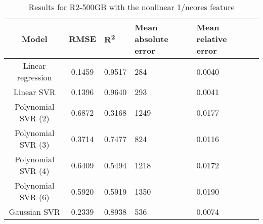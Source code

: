 \begin{table}[H]
\centering
\begin{adjustbox}{center}
\begin{tabular}{c | c M{1.2cm} M{2.5cm} M{2.5cm} M{1.8cm}}
Model & RMSE & R\textsuperscript{2} & Mean absolute error & Mean relative error \tabularnewline
\hline
Linear regression & 0.1459 & 0.9517 &    284 & 0.0040 \\
Linear SVR & 0.1396 & 0.9640 &    293 & 0.0041 \\
Polynomial SVR (2) & 0.6872 & 0.3168 &   1249 & 0.0177 \\
Polynomial SVR (3) & 0.3714 & 0.7477 &    824 & 0.0116 \\
Polynomial SVR (4) & 0.6409 & 0.5494 &   1218 & 0.0172 \\
Polynomial SVR (6) & 0.5920 & 0.5919 &   1350 & 0.0190 \\
Gaussian SVR & 0.2339 & 0.8938 &    536 & 0.0074 \\
\end{tabular}
\end{adjustbox}
\\
\caption{Results for R2-500GB with the nonlinear 1/ncores feature}
\label{tab:all_nonlinear_R2_500}
\end{table}
